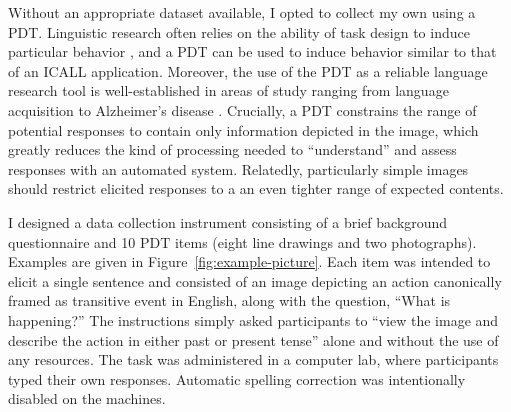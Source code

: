 Without an appropriate dataset available, I opted to collect my own using a PDT. Linguistic research often relies on the ability of task design to induce particular behavior \citep{skehan1998assessing}, and a PDT can be used to induce behavior similar to that of an ICALL application.  Moreover, the use of the PDT as a reliable language research tool is well-established in areas of study ranging from language acquisition to Alzheimer's disease \citep{ellis2000task,forbes2005detecting}. Crucially, a PDT constrains the range of potential responses to contain only information depicted in the image, which greatly reduces the kind of processing needed to ``understand'' and assess responses with an automated system. Relatedly, particularly simple images should restrict elicited responses to a an even tighter range of expected contents.

I designed a data collection instrument consisting of a brief background questionnaire and 10 PDT items (eight line drawings and two photographs). Examples are given in Figure~\ref{fig:example-picture}. Each item was intended to elicit a single sentence and consisted of an image depicting an action canonically framed as transitive event in English, along with the question, ``What is happening?'' The instructions simply asked participants to ``view the image and describe the action in either past or present tense'' alone and without the use of any resources. The task was administered in a computer lab, where participants typed their own responses. Automatic spelling correction was intentionally disabled on the machines.


